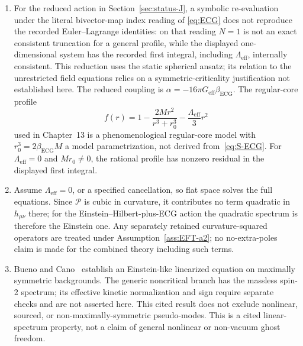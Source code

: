 \begin{enumerate}
  \item For the reduced action in Section~\ref{sec:status-J}, a
        symbolic re-evaluation under the literal bivector-map index
        reading of \eqref{eq:ECG} does not reproduce the recorded
        Euler--Lagrange identities: on that reading \(N=1\) is not
        an exact consistent truncation for a general profile, while
        the displayed one-dimensional system has the recorded first
        integral, including
        \(\Lambda_{\mathrm{eff}}\), internally consistent. This reduction uses
        the static spherical ansatz; its relation to the unrestricted field
        equations relies on a symmetric-criticality justification
        not established here. The reduced coupling is
        \(\alpha=-16\pi G_{\mathrm{eff}}\beta_{\mathrm{ECG}}\).
        The regular-core profile
        \begin{equation}
          \label{eq:fr-ECG}
          f(r)
          =1-\frac{2M r^2}{r^3+r_0^3}
           -\frac{\Lambda_{\mathrm{eff}}}{3}r^2
        \end{equation}
        used in Chapter~13 is a phenomenological regular-core model
        with \(r_0^3=2\beta_{\mathrm{ECG}}M\) a model
        parametrization, not derived from~\eqref{eq:S-ECG}. For
        \(\Lambda_{\mathrm{eff}}=0\) and \(Mr_0\ne0\), the rational
        profile has nonzero residual in the displayed first integral.
  \item Assume \(\Lambda_{\mathrm{eff}}=0\), or a specified
        cancellation, so flat space solves the full equations. Since
        \(\mathcal P\) is cubic in curvature, it contributes no term
        quadratic in \(h_{\mu\nu}\) there; for the
        Einstein--Hilbert-plus-ECG action the quadratic spectrum is
        therefore the Einstein one. Any separately retained
        curvature-squared operators are treated under
        Assumption~\ref{ass:EFT-a2}; no no-extra-poles claim is made
        for the combined theory including such terms.
  \item Bueno and Cano~\cite{Bueno2016ECG} establish an Einstein-like
        linearized equation on maximally symmetric backgrounds. The
        generic noncritical branch has the massless spin-2 spectrum;
        its effective kinetic normalization and sign require separate
        checks and are not asserted here. This cited result does not
        exclude nonlinear, sourced, or non-maximally-symmetric
        pseudo-modes. This is a cited linear-spectrum property, not
        a claim of general nonlinear or non-vacuum ghost freedom.
\end{enumerate}

